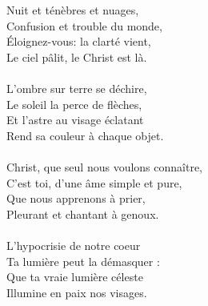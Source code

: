 Nuit et ténèbres et nuages,\\
Confusion et trouble du monde,\\
Éloignez-vous: la clarté vient,\\
Le ciel pâlit, le Christ est là.\\
\\
L’ombre sur terre se déchire,\\
Le soleil la perce de flèches,\\
Et l’astre au visage éclatant\\
Rend sa couleur à chaque objet.\\
\\
Christ, que seul nous voulons connaître,\\
C’est toi, d’une âme simple et pure,\\
Que nous apprenons à prier,\\
Pleurant et chantant à genoux.\\
\\
L’hypocrisie de notre coeur\\
Ta lumière peut la démasquer :\\
Que ta vraie lumière céleste\\
Illumine en paix nos visages.